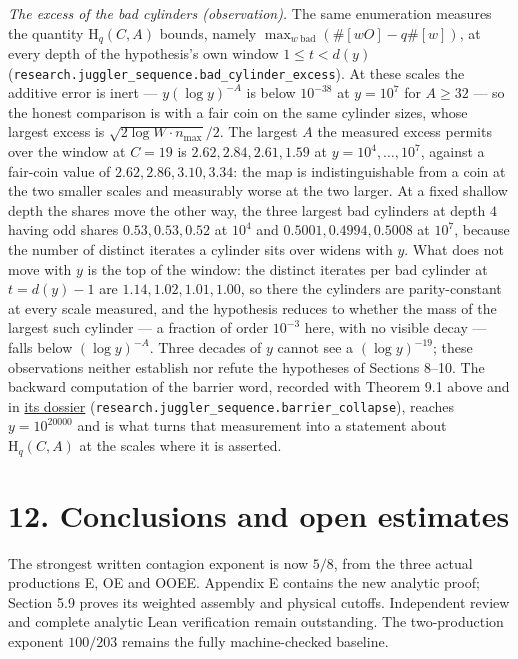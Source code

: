 \documentclass[11pt,a4paper]{article}
\begin{document}
\emph{The excess of the bad cylinders (observation).} The same
enumeration measures the quantity \(\mathrm H_q(C,A)\) bounds, namely
\(\max_{w\ \text{bad}}(\#[wO]-q\#[w])\), at every depth of the
hypothesis's own window \(1\le t<d(y)\)
(\texttt{\nolinkurl{research.juggler_sequence.bad_cylinder_excess}}). At
these scales the additive error is inert --- \(y(\log y)^{-A}\) is below
\(10^{-38}\) at \(y=10^7\) for \(A\ge32\) --- so the honest comparison
is with a fair coin on the same cylinder sizes, whose largest excess is
\(\sqrt{2\log W\cdot n_{\max}}/2\). The largest \(A\) the measured
excess permits over the window at \(C=19\) is \(2.62,2.84,2.61,1.59\) at
\(y=10^4,\dots,10^7\), against a fair-coin value of
\(2.62,2.86,3.10,3.34\): the map is indistinguishable from a coin at the
two smaller scales and measurably worse at the two larger. At a fixed
shallow depth the shares move the other way, the three largest bad
cylinders at depth \(4\) having odd shares \(0.53,0.53,0.52\) at
\(10^4\) and \(0.5001,0.4994,0.5008\) at \(10^7\), because the number of
distinct iterates a cylinder sits over widens with \(y\). What does not
move with \(y\) is the top of the window: the distinct iterates per bad
cylinder at \(t=d(y)-1\) are \(1.14,1.02,1.01,1.00\), so there the
cylinders are parity-constant at every scale measured, and the
hypothesis reduces to whether the mass of the largest such cylinder ---
a fraction of order \(10^{-3}\) here, with no visible decay --- falls
below \((\log y)^{-A}\). Three decades of \(y\) cannot see a
\((\log y)^{-19}\); these observations neither establish nor refute the
hypotheses of Sections 8--10. The backward computation of the barrier
word, recorded with Theorem 9.1 above and in
\href{https://github.com/sneakyweasel/btlab/blob/main/docs/problems/juggler_barrier_collapse.md}{its
dossier}
(\texttt{\nolinkurl{research.juggler_sequence.barrier_collapse}}),
reaches \(y=10^{20000}\) and is what turns that measurement into a
statement about \(\mathrm H_q(C,A)\) at the scales where it is asserted.

\section{12. Conclusions and open
estimates}\label{conclusions-and-open-estimates}

The strongest written contagion exponent is now \(5/8\), from the three
actual productions E, OE and OOEE. Appendix E contains the new analytic
proof; Section 5.9 proves its weighted assembly and physical cutoffs.
Independent review and complete analytic Lean verification remain
outstanding. The two-production exponent \(100/203\) remains the fully
machine-checked baseline.
\end{document}
